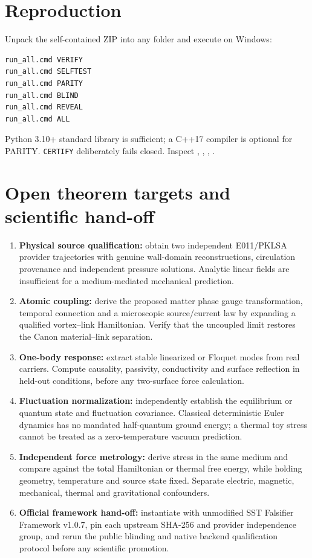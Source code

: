 \documentclass[10pt,a4paper]{article}
\begin{document}
\section{Reproduction}
Unpack the self-contained ZIP into any folder and execute on Windows:
\begin{verbatim}
run_all.cmd VERIFY
run_all.cmd SELFTEST
run_all.cmd PARITY
run_all.cmd BLIND
run_all.cmd REVEAL
run_all.cmd ALL
\end{verbatim}
Python 3.10+ standard library is sufficient; a C++17 compiler is optional for PARITY. \texttt{CERTIFY} deliberately fails closed. Inspect , , , .

\section{Open theorem targets and scientific hand-off}
\begin{enumerate}
\item \textbf{Physical source qualification:} obtain two independent E011/PKLSA provider trajectories with genuine wall-domain reconstructions, circulation provenance and independent pressure solutions. Analytic linear fields are insufficient for a medium-mediated mechanical prediction.
\item \textbf{Atomic coupling:} derive the proposed matter phase gauge transformation, temporal connection and a microscopic source/current law by expanding a qualified vortex--link Hamiltonian. Verify that the uncoupled limit restores the Canon material--link separation.
\item \textbf{One-body response:} extract stable linearized or Floquet modes from real carriers. Compute causality, passivity, conductivity and surface reflection in held-out conditions, before any two-surface force calculation.
\item \textbf{Fluctuation normalization:} independently establish the equilibrium or quantum state and fluctuation covariance. Classical deterministic Euler dynamics has no mandated half-quantum ground energy; a thermal toy stress cannot be treated as a zero-temperature vacuum prediction.
\item \textbf{Independent force metrology:} derive stress in the same medium and compare against the total Hamiltonian or thermal free energy, while holding geometry, temperature and source state fixed. Separate electric, magnetic, mechanical, thermal and gravitational confounders.
\item \textbf{Official framework hand-off:} instantiate with unmodified SST Falsifier Framework v1.0.7, pin each upstream SHA-256 and provider independence group, and rerun the public blinding and native backend qualification protocol before any scientific promotion.
\end{enumerate}
\end{document}
